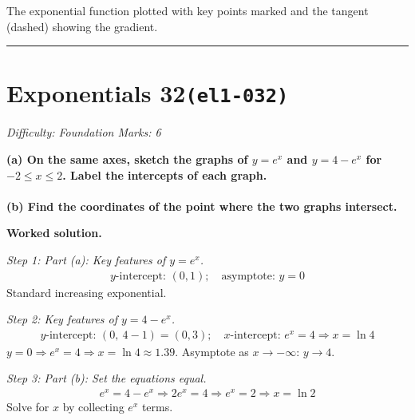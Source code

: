 \documentclass[11pt]{article}
\newcommand{\question}[1]{\par\medskip\noindent\textbf{#1}\par}
\begin{document}
\begin{center}
{
}
\end{center}
\small The exponential function plotted with key points marked and the tangent (dashed) showing the gradient.\normalsize

\medskip\hrule

\section*{Exponentials 32\quad\small\texttt{(el1-032)}}
\textit{Difficulty: Foundation \quad\textbar\quad Marks: 6}

\question{(a) On the same axes, sketch the graphs of \( y = e^x \) and \( y = 4 - e^x \) for \( -2 \leq x \leq 2 \). Label the intercepts of each graph.  \\[3pt]   \\[3pt]  (b) Find the coordinates of the point where the two graphs intersect.}

\textbf{Worked solution.}

\textit{Step 1: Part (a): Key features of \( y = e^x \).}
\[\begin{gathered}
y\text{-intercept: }(0,1); \quad \text{asymptote: }y=0
\end{gathered}\]
Standard increasing exponential.

\textit{Step 2: Key features of \( y = 4 - e^x \).}
\[\begin{gathered}
y\text{-intercept: }(0,\ 4-1)=(0,3); \quad x\text{-intercept: }e^x=4 \Rightarrow x = \ln 4
\end{gathered}\]
\( y = 0 \Rightarrow e^x = 4 \Rightarrow x = \ln 4 \approx 1.39 \). Asymptote as \( x \to -\infty \): \( y \to 4 \).

\textit{Step 3: Part (b): Set the equations equal.}
\[\begin{gathered}
e^x = 4 - e^x \Rightarrow 2e^x = 4 \Rightarrow e^x = 2 \Rightarrow x = \ln 2
\end{gathered}\]
Solve for \( x \) by collecting \( e^x \) terms.
\end{document}
